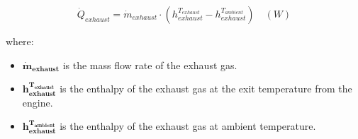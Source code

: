 \documentclass{report}
\begin{document}
\begin{equation}
    \label{eq:q.exh}
    \dot{Q}_{exhaust}=\dot{m}_{exhaust}\cdot (h^{T_{exhaust}}_{exhaust}-h^{T_{ambient}}_{exhaust})\quad (W)
\end{equation}

where:

\begin{itemize}
    \item $\boldsymbol{\dot{m}_{exhaust}}$ is the mass flow rate of the exhaust gas.
    \item $\boldsymbol{h^{T_{exhaust}}_{exhaust}}$ is the enthalpy of the exhaust gas at the exit temperature from the engine.
    \item $\boldsymbol{h^{T_{ambient}}_{exhaust}}$ is the enthalpy of the exhaust gas at ambient temperature.
\end{itemize}
\end{document}

